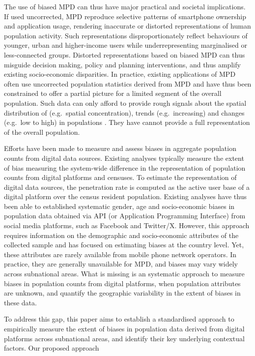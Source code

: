 \documentclass[]{rsos}%
\begin{document}
The use of biased MPD can thus have major practical and societal
implications. If used uncorrected, MPD reproduce selective patterns of smartphone ownership and application
usage, rendering inaccurate or distorted representations of human population activity.
Such representations disproportionately reflect behaviours of younger, urban and
higher-income users while underrepresenting marginalised or
less-connected groups. Distorted representations based on biased MPD
can thus misguide decision making, policy and planning interventions,
and thus amplify existing socio-economic disparities.
In practice, existing applications of MPD often use
uncorrected population statistics derived from MPD and
have thus been constrained to offer a partial picture for a limited segment of the overall population.
Such data can only afford to provide rough signals about the spatial distribution of (e.g.~spatial
concentration), trends (e.g.~increasing) and changes (e.g.~low to high)
in populations \citep{rowe22-sensing-ukraine}.
They have cannot provide a full representation of the overall population.

Efforts have been made to measure and assess biases in aggregate population counts from digital data sources.
Existing analyses typically measure the extent of bias measuring the system-wide difference in the representation of population counts from digital platforms and censuses. To estimate the representation of digital data sources, the penetration rate is computed as the active user base of a digital platform over the census resident population.
Existing analyses have thus been able to established systematic gender, age and socio-economic biases in population data obtained via API (or Application Programming Interface) from social media platforms, such as Facebook and Twitter/X.
However, this approach requires information on the demographic and socio-economic attributes of the collected sample and has focused on estimating biases at the country level.
Yet, these attributes are rarely available from mobile phone network operators.
In practice, they are generally unavailable for MPD, and biases may vary widely across subnational areas.
What is missing is an systematic approach to measure biases in population counts from digital platforms, when population attributes are unknown, and quantify the geographic variability in the extent of biases in these data.

To address this gap, this paper aims to establish a standardised approach to empirically measure the extent of biases in population data derived from digital platforms across subnational areas, and identify their key underlying contextual factors.
Our proposed approach
\end{document}
